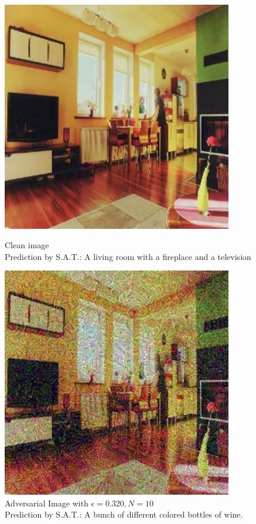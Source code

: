 \begin{figure}[ht]
    \centering
    \begin{minipage}{0.45\textwidth}
        \centering
        \includegraphics[width=0.9\textwidth]{../code/ShowDistractAndDeceive/samples/0.000/img_0.jpg} %
        \caption*{Clean image\\Prediction by S.A.T.: A living room with a fireplace and a television}
    \end{minipage}\hfill
    \begin{minipage}{0.45\textwidth}
        \centering
        \includegraphics[width=0.9\textwidth]{../code/ShowDistractAndDeceive/samples/0.320/img_0.jpg} %
        \caption*{Adversarial Image with $\epsilon=0.320, N=10$\\Prediction by S.A.T.: A bunch of different colored bottles of wine.}
    \end{minipage}
\end{figure}

